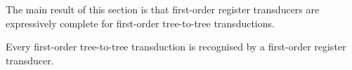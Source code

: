  


The main result of this section is that first-order register transducers are expressively complete for first-order tree-to-tree transductions. 

\begin{theorem}\label{thm:stt}
    Every first-order tree-to-tree transduction is recognised by a first-order  register transducer. 
\end{theorem}

